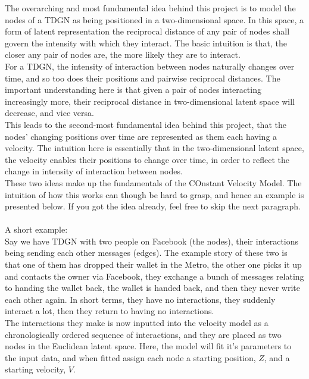 The overarching and most fundamental idea behind this project is to model the nodes of a TDGN as being positioned in a two-dimensional space. 
In this space, a form of latent representation the reciprocal distance of any pair of nodes shall govern the intensity with which they interact.
The basic intuition is that, the closer any pair of nodes are, the more likely they are to interact.
\\
For a TDGN, the intensity of interaction between nodes naturally changes over time, and so too does their positions and pairwise reciprocal distances.
The important understanding here is that given a pair of nodes interacting increasingly more, their reciprocal distance in two-dimensional latent space will decrease, and vice versa.
\\
This leads to the second-most fundamental idea behind this project, that the nodes' changing positions over time are represented as them each having a velocity. 
The intuition here is essentially that in the two-dimensional latent space, the velocity enables their positions to change over time, in order to reflect the change in intensity of interaction between nodes.
\\
These two ideas make up the fundamentals of the COnstant Velocity Model.
The intuition of how this works can though be hard to grasp, and hence an example is presented below.
If you got the idea already, feel free to skip the next paragraph.
\\\\
A short example:
\\
Say we have TDGN with two people on Facebook (the nodes), their interactions being sending each other messages (edges). 
The example story of these two is that one of them has dropped their wallet in the Metro, the other one picks it up and contacts the owner via Facebook, they exchange a bunch of messages relating to handing the wallet back, the wallet is handed back, and then they never write each other again.
In short terms, they have no interactions, they suddenly interact a lot, then they return to having no interactions.
\\
The interactions they make is now inputted into the velocity model as a chronologically ordered sequence of interactions, and they are placed as two nodes in the Euclidean latent space.
Here, the model will fit it's parameters to the input data, and when fitted assign each node a starting position, $Z$, and a starting velocity, $V$. 
